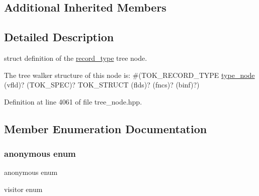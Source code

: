 \subsection*{Additional Inherited Members}


\subsection{Detailed Description}
struct definition of the \hyperlink{structrecord__type}{record\+\_\+type} tree node. 

The tree walker structure of this node is\+: \#(T\+O\+K\+\_\+\+R\+E\+C\+O\+R\+D\+\_\+\+T\+Y\+PE \hyperlink{structtype__node}{type\+\_\+node} (vfld)? (T\+O\+K\+\_\+\+S\+P\+EC)? T\+O\+K\+\_\+\+S\+T\+R\+U\+CT (flds)? (fncs)? (binf)?) 

Definition at line 4061 of file tree\+\_\+node.\+hpp.



\subsection{Member Enumeration Documentation}
\mbox{\label{structrecord__type_a2a26a4b7792dfcbb8940e4c0dac57a80}} 
\subsubsection{\texorpdfstring{anonymous enum}{anonymous enum}}
{\footnotesize\ttfamily anonymous enum}



visitor enum 

